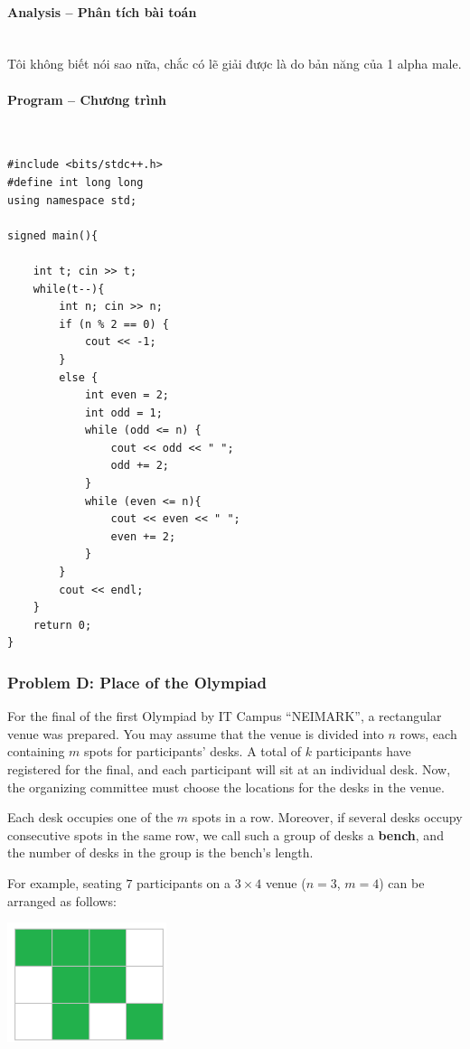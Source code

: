 \documentclass{article}
\begin{document}
\paragraph{Analysis -- Phân tích bài toán} \mbox{} \\

Tôi không biết nói sao nữa, chắc có lẽ giải được là do bản năng của 1 alpha male.

\paragraph{Program -- Chương trình} \mbox{} \\

\begin{lstlisting}
#include <bits/stdc++.h>
#define int long long
using namespace std;

signed main(){

	int t; cin >> t;
	while(t--){
		int n; cin >> n;
		if (n % 2 == 0) {
			cout << -1;
		}
		else {
			int even = 2;
			int odd = 1;
			while (odd <= n) {
				cout << odd << " ";
				odd += 2;
			}
			while (even <= n){
				cout << even << " ";
				even += 2;
			}
		}
		cout << endl;
	}
	return 0;
}
\end{lstlisting}

\subsubsection{Problem D: Place of the Olympiad}

For the final of the first Olympiad by IT Campus ``NEIMARK'', a rectangular venue was prepared. You may assume that the venue is divided into $n$ rows, each containing $m$ spots for participants' desks. A total of $k$ participants have registered for the final, and each participant will sit at an individual desk. Now, the organizing committee must choose the locations for the desks in the venue.

Each desk occupies one of the $m$ spots in a row. Moreover, if several desks occupy consecutive spots in the same row, we call such a group of desks a \textbf{bench}, and the number of desks in the group is the bench's length.

For example, seating $7$ participants on a $3 \times 4$ venue ($n=3$, $m=4$) can be arranged as follows:\\

\begin{center}
    \includegraphics[width=0.35\textwidth]{Figures/CF_Round1013_D_1.png} 
\end{center}
\end{document}

